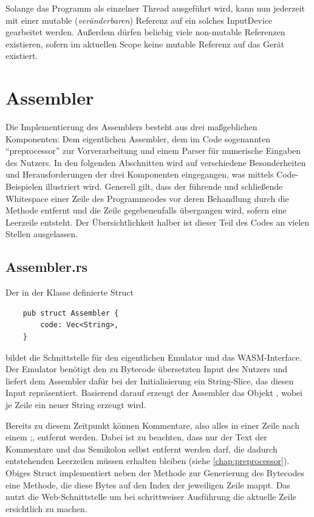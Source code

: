 \qquad{}

Solange das Programm als einzelner Thread ausgeführt wird, kann nun jederzeit mit einer mutable (\textit{veränderbaren}) Referenz auf ein solches InputDevice gearbeitet werden. Außerdem dürfen beliebig viele non-mutable Referenzen existieren, sofern im aktuellen Scope keine mutable Referenz auf das Gerät existiert.

\section{Assembler}\label{chap:impl-assembler}

Die Implementierung des Assemblers besteht aus drei maßgeblichen Komponenten: Dem eigentlichen Assembler, dem im Code sogenannten \enquote{preprocessor} zur Vorverarbeitung und einem Parser für numerische Eingaben des Nutzers. In den folgenden Abschnitten wird auf verschiedene Besonderheiten und Herausforderungen der drei Komponenten eingegangen, was mittels Code-Beispielen illustriert wird. Generell gilt, dass der führende und schließende Whitespace einer Zeile des Programmcodes vor deren Behandlung durch die Methode  entfernt und die Zeile gegebenenfalls übergangen wird, sofern eine Leerzeile entsteht. Der Übersichtlichkeit halber ist dieser Teil des Codes an vielen Stellen ausgelassen.

\subsection{Assembler.rs}

Der in der Klasse  definierte Struct 
\begin{verbatim}
    pub struct Assembler {
        code: Vec<String>,
    }
\end{verbatim}
bildet die Schnittstelle für den eigentlichen Emulator und das \ac{WASM}-Interface. Der Emulator benötigt den zu Bytecode übersetzten Input des Nutzers und liefert dem Assembler dafür bei der Initialisierung ein String-Slice, das diesen Input repräsentiert. Basierend darauf erzeugt der Assembler das Objekt , wobei je Zeile ein neuer String erzeugt wird. 

Bereits zu diesem Zeitpunkt können Kommentare, also alles in einer Zeile nach einem \glqq ;\grqq, entfernt werden. Dabei ist zu beachten, dass nur der Text der Kommentare und das Semikolon selbst entfernt werden darf, die dadurch entstehenden Leerzeilen müssen erhalten bleiben (siehe \ref{chap:preprocessor}). Obiges Struct implementiert neben der Methode  zur Generierung des Bytecodes eine Methode, die diese Bytes auf den Index der jeweiligen Zeile mappt. Das nutzt die Web-Schnittstelle um bei schrittweiser Ausführung die aktuelle Zeile ersichtlich zu machen.

